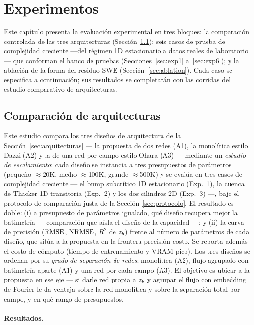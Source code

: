 \section{Experimentos}
\label{sec:exp}

Este capítulo presenta la evaluación experimental en tres bloques: la
comparación controlada de las tres arquitecturas
(Sección~\ref{sec:arch-comp}); seis casos de prueba de complejidad creciente
---del régimen 1D estacionario a datos reales de laboratorio--- que conforman
el banco de pruebas (Secciones~\ref{sec:exp1} a~\ref{sec:exp6}); y la ablación
de la forma del residuo SWE (Sección~\ref{sec:ablation}). Cada caso se
especifica a continuación; sus resultados se completarán con las corridas del
estudio comparativo de arquitecturas.

\subsection{Comparación de arquitecturas}
\label{sec:arch-comp}

Este estudio compara los tres diseños de arquitectura de la
Sección~\ref{sec:arquitecturas} --- la propuesta de dos redes (A1), la
monolítica estilo Dazzi (A2) y la de una red por campo estilo Ohara (A3) ---
mediante un
\emph{estudio de escalamiento}: cada diseño se instancia a tres presupuestos
de parámetros (pequeño $\approx$20K, medio $\approx$100K, grande
$\approx$500K) y se evalúa en tres casos de complejidad creciente --- el bump
subcrítico 1D estacionario (Exp.~1), la cuenca de Thacker 1D transitoria
(Exp.~2) y los dos cilindros 2D (Exp.~3) ---, bajo el protocolo de comparación
justa de la Sección~\ref{sec:protocolo}. El resultado es doble: (i) a
presupuesto de parámetros igualado, qué diseño recupera mejor la batimetría
--- comparación que aísla el diseño de la capacidad ---; y (ii) la curva de
precisión ($\mathrm{RMSE}$, $\mathrm{NRMSE}$, $R^2$ de $z_b$) frente al número de parámetros
de cada diseño, que sitúa a la propuesta en la frontera precisión-costo. Se
reporta además el costo de cómputo (tiempo de entrenamiento y VRAM pico). Los
tres diseños se ordenan por su \emph{grado de separación de redes}: monolítica
(A2), flujo agrupado con batimetría aparte (A1) y una red por cada campo (A3).
El objetivo es ubicar a la propuesta en ese eje --- si darle red propia a
$z_b$ y agrupar el flujo con embedding de Fourier le da ventaja sobre la red
monolítica y sobre la separación total por campo, y en qué rango de
presupuestos.

\paragraph{Resultados.}

